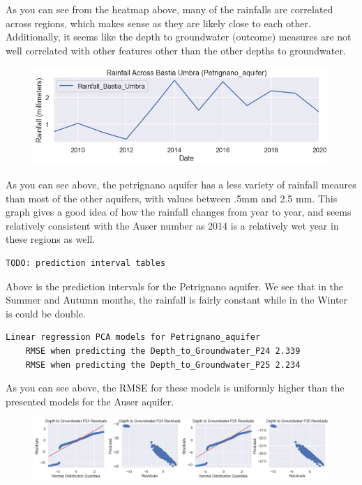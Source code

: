 \documentclass[12pt, letterpaper]{article}
\begin{document}
As you can see from the heatmap above, many of the rainfalls are correlated across regions, which makes sense as they are likely close to each other. Additionally, it seems like the depth to groundwater (outcome) measures are not well correlated with other features other than the other depths to groundwater.

\begin{figure}[H]
    \includegraphics[width=.75\textwidth]{aq_petrigano_rainfall.png}
    \centering
\end{figure}

As you can see above, the petrignano aquifer has a less variety of rainfall meaures than most of the other aquifers, with values between .5mm and 2.5 mm. This graph gives a good idea of how the rainfall changes from year to year, and seems relatively consistent with the Auser number as 2014 is a relatively wet year in these regions as well.

\begin{verbatim}
TODO: prediction interval tables
\end{verbatim}

Above is the prediction intervals for the Petrignano aquifer. We see that in the Summer and Autumn months, the rainfall is fairly constant while in the Winter is could be double.

\begin{verbatim}
Linear regression PCA models for Petrignano_aquifer
    RMSE when predicting the Depth_to_Groundwater_P24 2.339
    RMSE when predicting the Depth_to_Groundwater_P25 2.234
\end{verbatim}

As you can see above, the RMSE for these models is uniformly higher than the presented models for the Auser aquifer.

\begin{figure}[H]
    \includegraphics[width=.75\textwidth]{aq_petrigano_residuals.png}
    \centering
\end{figure}
\end{document}
